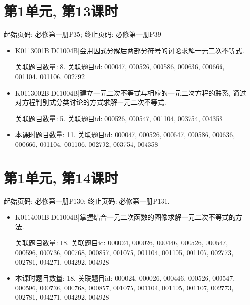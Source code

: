 \section*{第1单元, 第13课时}
起始页码: 必修第一册P35; 终止页码: 必修第一册P39.
\begin{itemize}
\item K0113001B|D01004B|会用因式分解后两部分符号的讨论求解一元二次不等式.

关联题目数量: 8. 关联题目id: 000047, 000526, 000586, 000636, 000666, 001104, 001106, 002792

\item K0113002B|D01004B|建立一元二次不等式与相应的一元二次方程的联系, 通过对方程判别式分类讨论的方式求解一元二次不等式.

关联题目数量: 5. 关联题目id: 000526, 000547, 001104, 003754, 004358

\item 本课时题目数量: 11. 关联题目id: 000047, 000526, 000547, 000586, 000636, 000666, 001104, 001106, 002792, 003754, 004358

\end{itemize}

\section*{第1单元, 第14课时}
起始页码: 必修第一册P130; 终止页码: 必修第一册P131.
\begin{itemize}
\item K0114001B|D01004B|掌握结合一元二次函数的图像求解一元二次不等式的方法.

关联题目数量: 18. 关联题目id: 000024, 000026, 000446, 000526, 000547, 000596, 000736, 000768, 000857, 001075, 001104, 001105, 001107, 002773, 002781, 004271, 004292, 004928

\item 本课时题目数量: 18. 关联题目id: 000024, 000026, 000446, 000526, 000547, 000596, 000736, 000768, 000857, 001075, 001104, 001105, 001107, 002773, 002781, 004271, 004292, 004928

\end{itemize}

